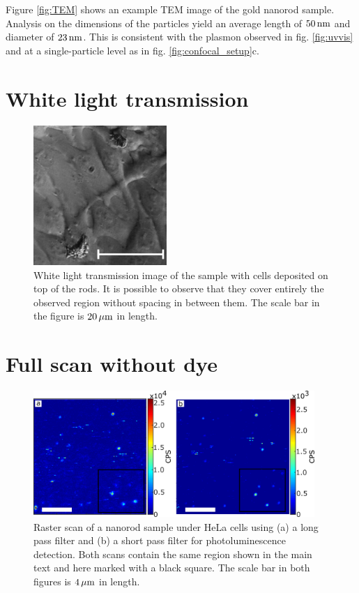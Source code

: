 Figure \ref{fig:TEM} shows an example TEM image of the gold nanorod sample.
Analysis on the dimensions of the particles yield an average length of $50\,\textrm{nm}$
and diameter of $23\,\textrm{nm}$. This is consistent with the plasmon observed in fig.
\ref{fig:uvvis} and at a single-particle level as in fig.
\ref{fig:confocal_setup}c.

\section{White light transmission}
\begin{figure}[htp]
\centering
	\includegraphics[width=0.45\textwidth]{Chapters/03_Background_Free/Figures/Supplementary/05_White_Light/white_light_scale.png}
	\caption{White light transmission image of the sample with cells deposited on
	top of the rods. It is possible to observe that they cover entirely the
	observed region without spacing in between them. The scale bar in the figure
	is $20\,\mu\textrm{m}$ in length.}
	\label{fig:white-light}
\end{figure}

\section{Full scan without dye}
\begin{figure}[htp] \centering
\includegraphics[width=0.95\textwidth]{Chapters/03_Background_Free/Figures/Supplementary/06_Full_scans/full_no_dye.png}
\caption{Raster scan of a nanorod sample under HeLa cells using (a) a long pass
filter and (b) a short pass filter for photoluminescence detection. Both scans
contain the same region shown in the main text and here marked with a black
square. The scale bar in both figures is $4\,\mu\textrm{m}$ in length.}
	\label{fig:full_no_dye}
\end{figure}

